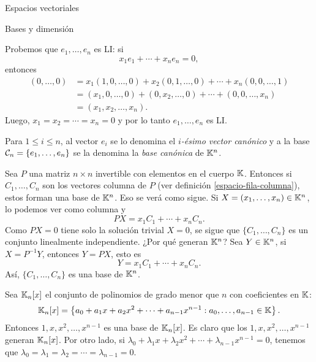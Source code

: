 \begin{chapter}{Espacios vectoriales}
\begin{section}{Bases y dimensi\'on}
\begin{ejemplo*}
        Probemos que $e_1,\ldots,e_n$ es LI: si 
        $$
        x_1e_1+\cdots+x_ne_n =0,
        $$
        entonces
        \begin{align*}
            (0,\ldots,0) &= x_1(1,0,\ldots,0)+ x_2(0,1,\ldots,0)+\cdots+x_n(0,0,\ldots,1)\\ 
            &=  (x_1,0,\ldots,0)+(0,x_2,\ldots,0)+\cdots+(0,0,\ldots,x_n)\\ &= (x_1,x_2,\ldots,x_n).
        \end{align*}
        Luego, $x_1= x_2=\cdots=x_n =0$ y por lo tanto $e_1,\ldots,e_n$ es LI.
        
        Para $1 \le i \le n$, al vector $e_i$ se lo denomina el \textit{$i$-ésimo vector canónico}  y a la base $\mathcal{C}_n = \left\{e_1,\ldots,e_n \right\}$ se la denomina la \textit{base canónica} de $\mathbb K^n$. 
\end{ejemplo*}
 
 
 \begin{ejemplo*}
     Sea $P$ una matriz $n \times n$ invertible con elementos en el cuerpo $\mathbb K$. Entonces si $C_1,\ldots,C_n$ son los vectores columna de $P$ (ver definición  \ref{espacio-fila-columna}), estos forman una base de $\mathbb K^n$. Eso se verá como sigue. Si $X = (x_1,\ldots,x_n) \in \mathbb K^n$, lo podemos ver como columna y 
     $$
     PX=x_1C_1+\cdots+x_nC_n.
     $$
     Como $PX=0$ tiene solo la solución trivial $X= 0$, se sigue que $\{C_1,\ldots,C_n\}$ es un conjunto linealmente independiente. ¿Por qué generan $\mathbb K^n$? Sea $Y \in \mathbb K^n$, si $X = P^{-1} Y$, entonces $Y = PX$, esto es
     $$
     Y=x_1C_1+\cdots+x_nC_n.
     $$
     Así, $\{C_1,\ldots,C_n\}$ es una base de $\mathbb K^n$.
 \end{ejemplo*}


\begin{ejemplo*}
    Sea $\mathbb K_n[x]$  el conjunto de polinomios de grado menor  que $n$ con coeficientes en $\mathbb K$:
    $$
    \mathbb K_n[x] = \left\{a_0 + a_1 x + a_2x^2+\cdots+a_{n-1}x^{n-1}: a_0,\ldots,a_{n-1} \in \mathbb K  \right\}.
    $$
    Entonces $1,x,x^2,\ldots,x^{n-1}$  es una base de $\mathbb K_n[x]$. Es claro que los $1,x,x^2,\ldots,x^{n-1}$ generan $\mathbb K_n[x]$. Por otro lado, si  $\lambda_0 + \lambda_1 x + \lambda_2x^2+\cdots+\lambda_{n-1}x^{n-1} =0$, tenemos que $\lambda_0=\lambda_1 = \lambda_2 =\cdots =\lambda_{n-1} =0$.
\end{ejemplo*}


\end{section}
\end{chapter}
